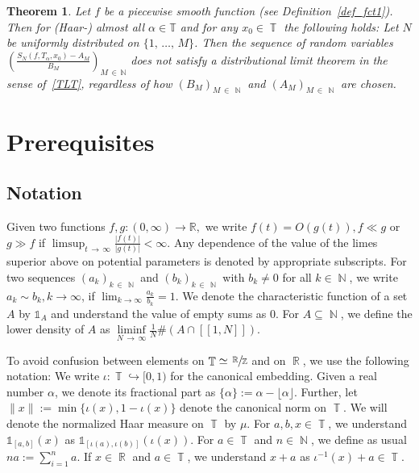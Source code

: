\documentclass[10pt,a4paper]{amsart}
\numberwithin{equation}{section}
\DeclareMathOperator{\R}{\mathbb{R}}
\DeclareMathOperator{\N}{\mathbb{N}}
\DeclareMathOperator{\T}{\mathbb{T}}
\newcommand{\bbN}{\mathbb{N}}
\newcommand{\bbT}{\mathbb{T}}
\newcommand{\bbR}{\mathbb{R}}
\newcommand{\bbZ}{\mathbb{Z}}
\newtheorem{theo}{Theorem}[section]
\theoremstyle{definition}
\begin{document}
\setcounter{theo}{1}
\begin{theo}\label{thm_no_LT}
Let $f$ be a piecewise smooth function (see Definition~\ref{def_fct1}). Then for (Haar-) almost all $ \alpha \in \bbT$ and for any $x_0 \in \T$ the following holds: Let $N$ be uniformly distributed on $\{1,\,\ldots,\,M\}$. Then the sequence of random variables $(\frac{S_{N}(f,T_{\alpha},x_0) - A_M}{B_M})_{M\,\in\,\bbN}$ does not satisfy a distributional limit theorem in the sense of~\eqref{TLT}, regardless of how $(B_M)_{M\,\in\,\N}$ and $(A_M)_{M\,\in\,\N}$ are chosen.
\end{theo}

\section{Prerequisites}\label{Sec_preReq}

\subsection*{Notation}

Given two functions $f,g:(0,\infty)\to \bbR,$ we write $f(t) = O(g(t)), f \ll g$ or $g \gg f$ if $\limsup_{t\,\to\,\infty} \frac{|f(t)|}{|g(t)|} < \infty$. Any dependence of the value of the limes superior above on potential parameters is denoted by appropriate subscripts. For two sequences $ (a_k)_{k\,\in\,\N}$ and $(b_k)_{k \,\in\,\N}$ with $b_k \neq 0$ for all $k \in \N$, we write $a_k \sim b_k, k \to \infty$, if $ \lim_{k \to \infty} \frac{a_k}{b_k}=1$. We denote the characteristic function of a set $A$ by $\mathds{1}_A$ and understand the value of empty sums as $0$. For $A \subseteq \N$, we define the lower density of $A$ as $\liminf\limits_{N\,\to\,\infty}\frac{1}{N} \# (A \cap [\![1,N]\!])$.

\noindent To avoid confusion between elements on $\T \simeq {\Large{\sfrac{\R}{\bbZ}}}$ and on $\R$, we use the following notation: We write $\iota: \T \hookrightarrow [0,1)$ for the canonical embedding. Given a real number $\alpha$, we denote its fractional part as $\{ \alpha \} := \alpha - \lfloor \alpha \rfloor $. Further, let $\| x \| := \min\{\iota(x),1 - \iota(x)\}$ denote the canonical norm on $\T$. We will denote the normalized Haar measure on $\T$ by $\mu$. For $a,b,x \in \T$, we understand $ \mathds{1}_{[a,b]}(x) $ as $ \mathds{1}_{[\iota(a),\iota(b)]}(\iota(x))$. For $a \in \T$ and $n \in \N$, we define as usual $na :=\sum_{i=1}^n a$. If $x \in \R$ and $a \in \T$, we understand $x + a $ as $\iota^{-1}(x) + a \in \T $.
\end{document}
